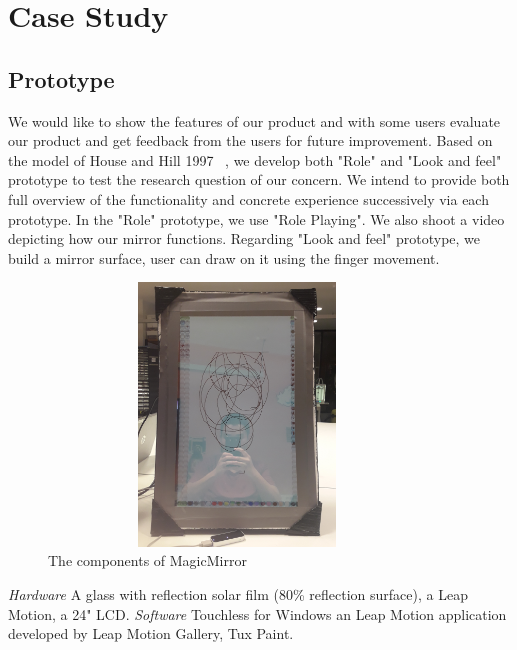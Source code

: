 \documentclass[11pt]{article}
\begin{document}
\section{Case Study}
\subsection{Prototype}
We would like to show the features of our product and with some users evaluate our product and get feedback from the users for future improvement.
Based on the model of House and Hill 1997 ~\cite{houdeChapter16What1997}, we develop both "Role" and "Look and feel" prototype to test the research question of our concern. We intend to provide both full overview of the functionality and concrete experience successively via each prototype.
In the "Role" prototype, we use "Role Playing". We also shoot a video depicting how our mirror functions. Regarding "Look and feel" prototype, we build a mirror surface, user can draw on it using the finger movement.
\begin{figure}[h]
\caption{The components of MagicMirror}
\centering
\includegraphics[width=10cm, height=7cm, angle=-90]{prototype}
\end{figure}
\linebreak
\textit{Hardware}
A glass with reflection solar film (80\% reflection surface), a Leap Motion, a 24" LCD.
\textit{Software}
Touchless for Windows an Leap Motion application developed by Leap Motion Gallery, Tux Paint.


\end{document}
